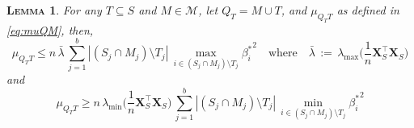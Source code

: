 \documentclass[bj,authoryear]{imsart}
\theoremstyle{plain}
\newtheorem{lem}[thm]{\textsc{Lemma}}
\newcommand{\M}{\mathcal{M}}
\newcommand{\bs}{\boldsymbol}
\begin{document}
\begin{lem}\label{lem:upperboundnoncentralgen}
    For any $T\subseteq S$ and $M\in \M$, let $Q_T=M\cup T$, and $\mu_{Q_T T}$ as defined in \eqref{eq:muQM}, then, 
    \begin{equation}\label{eq:upperbounnnnnd}
      \mu_{Q_TT} \leq n\,\bar{\lambda}\,\sum_{j=1}^b|(S_j\cap M_j )\setminus T_j|\,\max_{i\in (S_j\cap M_j )\setminus T_j}{\beta_{i}^*}^2 \quad \text{where}\quad \bar{\lambda}\,:=\,\lambda_{\max}\Big(\frac1n \bs X_{S}^\top\bs X_{S}\Big)  
    \end{equation}
    and
    \begin{equation}\label{eq:lowerbounnnnnd}
    \mu_{Q_TT} \geq n\,\lambda_{\min}\Big(\frac1n \bs X_{S}^\top\bs X_{S}\Big)\,\sum_{j=1}^b|(S_j\cap M_j )\setminus T_j|\,\min_{i\in (S_j\cap M_j )\setminus T_j}{\beta_{i}^*}^2
    \end{equation}
\end{lem}
\end{document}
